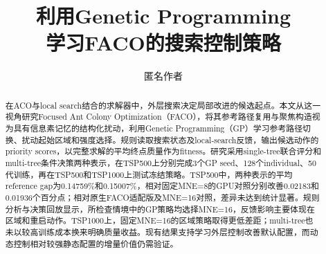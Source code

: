 \documentclass[runningheads,orivec]{llncs}
\begin{document}
\title{利用Genetic Programming\\学习FACO的搜索控制策略}
\author{匿名作者}
\institute{}
\maketitle
\begin{abstract}
在ACO与local search结合的求解器中，外层搜索决定局部改进的候选起点。本文从这一视角研究Focused Ant Colony Optimization（FACO），将其参考路径复用与聚焦构造视为具有信息素记忆的结构化扰动，利用Genetic Programming（GP）学习参考路径切换、扰动起始区域和强度选择。规则读取搜索状态及local-search反馈，输出候选动作的priority scores，以完整求解的平均终点质量作为fitness。研究采用single-tree联合评分和multi-tree条件决策两种表示，在TSP500上分别完成3个GP seed、128个individual、50代训练，再在TSP500和TSP1000上测试冻结策略。TSP500中，两种表示的平均reference gap为0.14759\%和0.15007\%，相对固定MNE=8的GPU对照分别改善0.02183和0.01936个百分点；相对原生FACO适配版及MNE=16对照，差异未达到统计显著。规则分析与决策回放显示，所检查情境中的GP策略均选择MNE=16，反馈影响主要体现在区域和重启动作。TSP1000上，固定MNE=16的区域策略取得更低差距；multi-tree也未以较高训练成本换来明确质量收益。现有结果支持学习外层控制改善默认配置，而动态控制相对较强静态配置的增量价值仍需验证。
\end{abstract}







\end{document}
